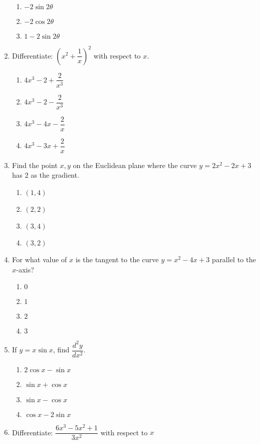 \begin{multicols}{2}
\begin{enumerate}[label={\arabic*.}]
\begin{enumerate}[label={\Alph*.}]
            \item  \(-2\sin 2\theta\)
            \item  \(-2\cos 2\theta\)
            \item  \(1-2\sin 2\theta\)
        \end{enumerate}
  \item Differentiate: \(\left({x}^{2} + \dfrac{1}{x}\right)^2\) with respect to \(x\).
       \begin{enumerate}[label={\Alph*.}]
            \item \(4{x}^{3} - 2 + \dfrac{2}{{x}^{3}}\)
            \item  \(4{x}^{3} - 2 - \dfrac{2}{{x}^{3}}\)
            \item   \(4{x}^{3} - 4x - \dfrac{2}{x}\)
            \item    \(4{x}^{3} - 3x + \dfrac{2}{x}\)
        \end{enumerate}
\item Find the point \(x,y\) on the Euclidean plane where the curve \(y = 2x^{2} - 2x +3\) has \(2\) as the gradient.
    \begin{enumerate}[label={\Alph*.}]
        \item \((1, 4)\)
        \item \((2, 2)\)
        \item \((3, 4)\)
        \item \((3, 2)\)
    \end{enumerate}  
\item For what value of \(x\) is the tangent to the curve \(y = x^{2} - 4x + 3\) parallel to the \(x\)-axis?
    \begin{enumerate}[label={\Alph*.}]
        \item \(0\)
        \item \(1\)
        \item \(2\)
        \item \(3\)
    \end{enumerate}   
\item If \(y = x \sin x\), find \( \dfrac{d^2y}{d{x}^{2}} \).
	\begin{enumerate}[label={\Alph*.}]
	\item \(2\cos x - \sin x\)
	\item \(\sin x + \cos x\)
	\item \(\sin x  - \cos  x\)
	\item \( \cos x  - 2\sin x \)
	\end{enumerate}
\item Differentiate: \(\dfrac{6x^{3} - 5x^{2} + 1}{3x^{2}}\) with respect to \(x\)

\end{enumerate}
\end{multicols}
